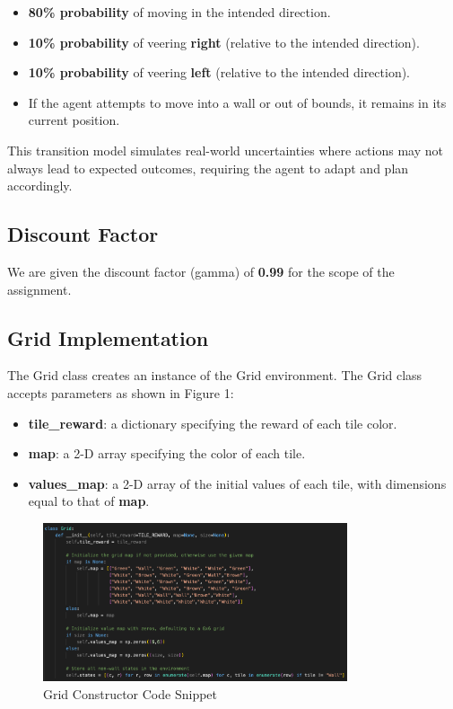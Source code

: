 \begin{itemize}
    \item \textbf{80\% probability} of moving in the intended direction.
    \item \textbf{10\% probability} of veering \textbf{right} (relative to the intended direction).
    \item \textbf{10\% probability} of veering \textbf{left} (relative to the intended direction).
    \item If the agent attempts to move into a wall or out of bounds, it remains in its current position.
\end{itemize}

\noindent This transition model simulates real-world uncertainties where actions may not always lead to expected outcomes, requiring the agent to adapt and plan accordingly.

\subsection{Discount Factor}
We are given the discount factor (gamma) of \textbf{0.99} for the scope of the assignment.

\subsection{Grid Implementation}
The Grid class creates an instance of the Grid environment. The Grid class accepts parameters as shown in Figure 1:

\begin{itemize}
    \item \textbf{tile\_reward}: a dictionary specifying the reward of each tile color.
    \item \textbf{map}: a 2-D array specifying the color of each tile.
    \item \textbf{values\_map}: a 2-D array of the initial values of each tile, with dimensions equal to that of \textbf{map}.
\end{itemize}

\vspace{10pt}  %

\begin{figure}[H]
    \centering
    \includegraphics[width=0.8\textwidth]{images/grid_constructor.png}
    \caption{Grid Constructor Code Snippet}
    \label{fig:grid_environment}
\end{figure}

